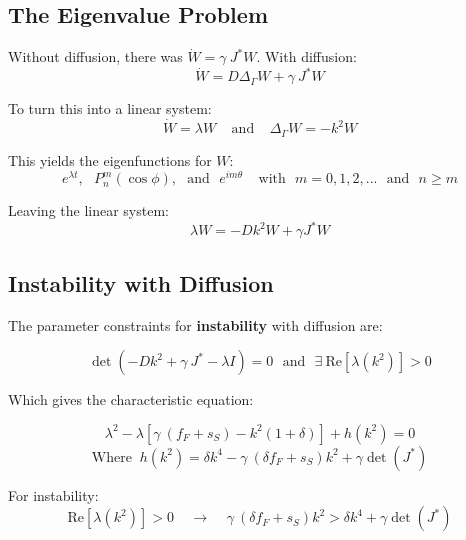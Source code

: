 \documentclass{beamer}
\begin{document}
        \subsection{The Eigenvalue Problem}
        
            \begin{frame}{\insertsubsectionhead}
            
                \begin{center}
                
                Without diffusion, there was $\dot{W}=\gamma~J^*W$. With diffusion:
                $$\dot{W}=D\Delta_\Gamma W+\gamma~J^*W$$
                
                To turn this into a linear system:
                $$ \dot{W}=\lambda W ~~~~~\text{and}~~~~~ \Delta_\Gamma W = -k^2W $$
                
                This yields  the eigenfunctions for $W$:
                $$e^{\lambda t},~~~P_n^m(\cos{\phi}),~~~\text{and}~~~e^{im\theta} ~~~~~\text{with} ~~~m=0,1,2,...~~~\text{and}~~~n\geq m$$
                
                Leaving the linear system:
                \Large
                $$ \lambda W = -Dk^2 W+\gamma J^*W$$
                
                \end{center}
            
            \end{frame}
        
        \subsection{Instability with Diffusion}
        
            \begin{frame}{\insertsubsectionhead}
            
            The parameter constraints for \textbf{instability} with diffusion are:
            
            $$ \det(  - Dk^2 + \gamma~J^*-\lambda I ) = 0 ~~~\text{and}~~~ \exists ~\text{Re}[\lambda(k^2)] > 0 $$
            
            Which gives the characteristic equation:
            
            $$\lambda^2 - \lambda[\gamma~(f_F+s_S)-k^2(1+\delta)] + h(k^2)=0$$
            $$ \text{Where } ~ h(k^2) = \delta k^4-\gamma~(\delta f_F + s_S)k^2 + \gamma\det(J^*) $$
            
            For instability: 
            $$\text{Re}[\lambda(k^2)]>0 ~~~~~\longrightarrow ~~~~~ \gamma~(\delta f_F+s_S)k^2 > \delta k^4+\gamma\det(J^*)$$
            
            \end{frame}
            
\end{document}
